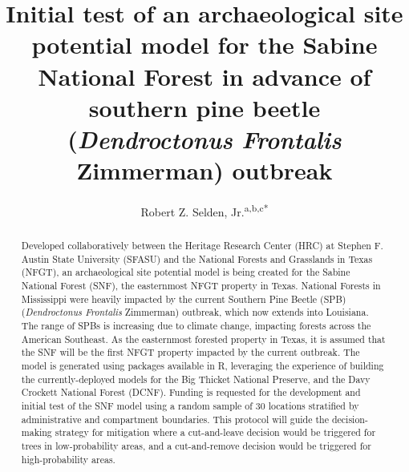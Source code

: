 \documentclass[review]{elsarticle}
\begin{document}
\begin{frontmatter}


\title{Initial test of an archaeological site potential model for the Sabine National Forest in advance of southern pine beetle (\textit{Dendroctonus Frontalis} Zimmerman) outbreak}



\author{Robert Z. Selden, Jr.\textsuperscript{a,b,c*}}
\address[1]{Heritage Research Center, Stephen F. Austin State University, United States}
\address[2]{Cultural Heritage Department, Jean Monnet University, France}
\address[3]{ORCID ID \href{http://orcid.org/0000-0002-1789-8449}{0000-0002-1789-8449}}

\begin{abstract}
Developed collaboratively between the Heritage Research Center (HRC) at Stephen F. Austin State University (SFASU) and the National Forests and Grasslands in Texas (NFGT), an archaeological site potential model is being created for the Sabine National Forest (SNF), the easternmost NFGT property in Texas. National Forests in Mississippi were heavily impacted by the current Southern Pine Beetle (SPB) (\textit{Dendroctonus Frontalis} Zimmerman) outbreak, which now extends into Louisiana. The  range of SPBs is increasing due to climate change, impacting forests across the American Southeast. As the easternmost forested property in Texas, it is assumed that the SNF will be the first NFGT property impacted by the current outbreak. The model is generated using packages available in R, leveraging the experience of building the currently-deployed models for the Big Thicket National Preserve, and the Davy Crockett National Forest (DCNF). Funding is requested for the development and initial test of the SNF model using a random sample of 30 locations stratified by administrative and compartment boundaries. This protocol will guide the decision-making strategy for mitigation where a cut-and-leave decision would be triggered for trees in low-probability areas, and a cut-and-remove decision would be triggered for high-probability areas.
\end{abstract}


\end{frontmatter}
\end{document}

